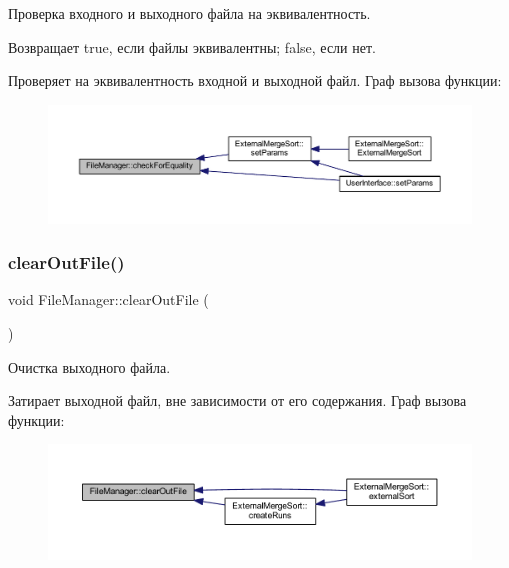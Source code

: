 Проверка входного и выходного файла на эквивалентность. 

\begin{DoxyReturn}{Возвращает}
true, если файлы эквивалентны; false, если нет.
\end{DoxyReturn}
Проверяет на эквивалентность входной и выходной файл. Граф вызова функции\+:\nopagebreak
\begin{figure}[H]
\begin{center}
\leavevmode
\includegraphics[width=350pt]{class_file_manager_ab490a5a5882d33781dcb6d1d42945d97_icgraph}
\end{center}
\end{figure}
\hypertarget{class_file_manager_a2f1102abfd0a5a9d7e178968a3fdc56c}{}\label{class_file_manager_a2f1102abfd0a5a9d7e178968a3fdc56c} 
\subsubsection{\texorpdfstring{clear\+Out\+File()}{clearOutFile()}}
{\footnotesize\ttfamily void File\+Manager\+::clear\+Out\+File (\begin{DoxyParamCaption}{ }\end{DoxyParamCaption})}



Очистка выходного файла. 

Затирает выходной файл, вне зависимости от его содержания. Граф вызова функции\+:\nopagebreak
\begin{figure}[H]
\begin{center}
\leavevmode
\includegraphics[width=350pt]{class_file_manager_a2f1102abfd0a5a9d7e178968a3fdc56c_icgraph}
\end{center}
\end{figure}
\hypertarget{class_file_manager_a4a4719a410ca31985e8b75ad75485ce6}{}\label{class_file_manager_a4a4719a410ca31985e8b75ad75485ce6} 
